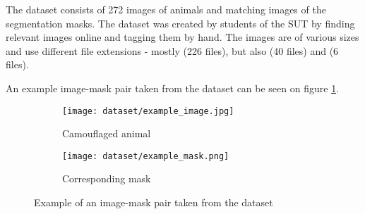\documentclass[../main.tex]{subfiles}
\begin{document}

The dataset consists of 272 images of animals and matching images of the segmentation masks. The dataset was created by students of the SUT by finding relevant images online and tagging them by hand.
The images are of various sizes and use different file extensions - mostly  (226 files), but also  (40 files) and  (6 files).

An example image-mask pair taken from the dataset can be seen on figure \ref{fig:dataset:image-mask-example}.

\begin{figure}[htb]
	\centering
	\begin{subfigure}{0.45\textwidth}
		\centering
		\texttt{[image: dataset/example\_image.jpg]}
		\caption{Camouflaged animal}
	\end{subfigure}
	\begin{subfigure}{0.45\textwidth}
		\centering
		\texttt{[image: dataset/example\_mask.png]}
		\caption{Corresponding mask}
	\end{subfigure}

	\caption{Example of an image-mask pair taken from the dataset}
	\label{fig:dataset:image-mask-example}

\end{figure}
\end{document}
